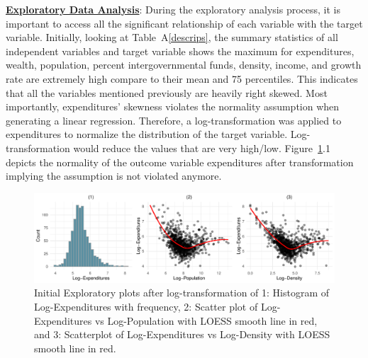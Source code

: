 \documentclass[11pt]{article}\usepackage[]{graphicx}\usepackage[]{color}
\makeatletter
\def\maxwidth{ %
  \ifdim\Gin@nat@width>\linewidth
    \linewidth
  \else
    \Gin@nat@width
  \fi
}
\makeatother
\begin{document}
\noindent\textbf{\underline{Exploratory Data Analysis}}: During the exploratory analysis process, it is important to access all the significant relationship of each variable with the target variable. Initially, looking at Table~A\ref{descrips}, the summary statistics of all independent variables and target variable shows the maximum for expenditures, wealth, population, percent intergovernmental funds, density, income, and growth rate are extremely high compare to their mean and 75 percentiles. This indicates that all the variables mentioned previously are heavily right skewed. Most importantly, expenditures’ skewness violates the normality assumption when generating a linear regression. Therefore, a log-transformation was applied to expenditures to normalize the distribution of the target variable. Log-transformation would reduce the values that are very high/low. Figure~\ref{inital-explore}.1 depicts the normality of the outcome variable expenditures after transformation implying the assumption is not violated anymore.

\begin{figure}[h!] 
\begin{center}

\includegraphics[width=\maxwidth]{figure/unnamed-chunk-1-1} 

\caption{Initial Exploratory plots after log-transformation of 1: Histogram of Log-Expenditures with frequency, 2: Scatter plot of Log-Expenditures vs Log-Population with LOESS smooth line in red, and 3: Scatterplot of Log-Expenditures vs Log-Density with LOESS smooth line in red.}
\label{inital-explore}
\end{center} 
\end{figure}
\end{document}
